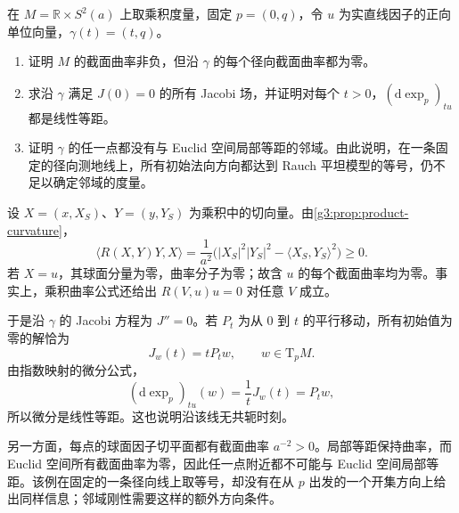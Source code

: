 \begin{exercise}\label{g3:ex:rauch-equality-single-geodesic}
	在 \(M=\mathbb R\times S^2(a)\) 上取乘积度量，固定 \(p=(0,q)\)，令 \(u\) 为实直线因子的正向单位向量，\(\gamma(t)=(t,q)\)。
	\begin{enumerate}
		\item 证明 \(M\) 的截面曲率非负，但沿 \(\gamma\) 的每个径向截面曲率都为零。
		\item 求沿 \(\gamma\) 满足 \(J(0)=0\) 的所有 Jacobi 场，并证明对每个 \(t>0\)，\((\mathrm d\exp_p)_{tu}\) 都是线性等距。
		\item 证明 \(\gamma\) 的任一点都没有与 Euclid 空间局部等距的邻域。由此说明，在一条固定的径向测地线上，所有初始法向方向都达到 Rauch 平坦模型的等号，仍不足以确定邻域的度量。
	\end{enumerate}
\end{exercise}
\begin{solution}
	设 \(X=(x,X_S)\)、\(Y=(y,Y_S)\) 为乘积中的切向量。由\cref{g3:prop:product-curvature}，
	\[
		\langle R(X,Y)Y,X\rangle
		=\frac1{a^2}\bigl(|X_S|^2|Y_S|^2-\langle X_S,Y_S\rangle^2\bigr)\ge0.
	\]
	若 \(X=u\)，其球面分量为零，曲率分子为零；故含 \(u\) 的每个截面曲率均为零。事实上，乘积曲率公式还给出 \(R(V,u)u=0\) 对任意 \(V\) 成立。

	于是沿 \(\gamma\) 的 Jacobi 方程为 \(J''=0\)。若 \(P_t\) 为从 \(0\) 到 \(t\) 的平行移动，所有初始值为零的解恰为
	\[
		J_w(t)=tP_tw,\qquad w\in \mathrm{T}_pM.
	\]
	由指数映射的微分公式，
	\[
		(\mathrm d\exp_p)_{tu}(w)=\frac1tJ_w(t)=P_tw,
	\]
	所以微分是线性等距。这也说明沿该线无共轭时刻。

	另一方面，每点的球面因子切平面都有截面曲率 \(a^{-2}>0\)。局部等距保持曲率，而 Euclid 空间所有截面曲率为零，因此任一点附近都不可能与 Euclid 空间局部等距。该例在固定的一条径向线上取等号，却没有在从 \(p\) 出发的一个开集方向上给出同样信息；邻域刚性需要这样的额外方向条件。
\end{solution}

